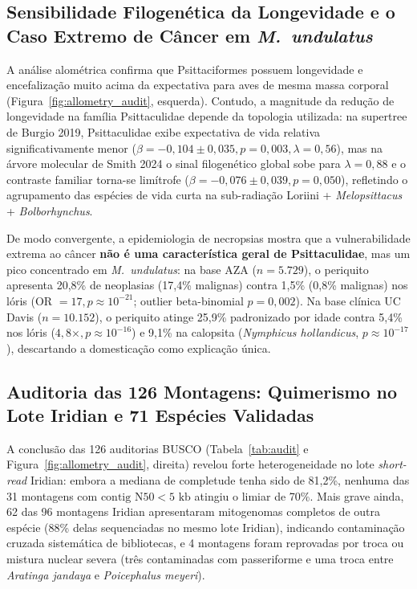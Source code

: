 \documentclass[10pt,a4paper,twocolumn]{article}
\begin{document}
\subsection{Sensibilidade Filogenética da Longevidade e o Caso Extremo de Câncer em \textit{M.\ undulatus}}
A análise alométrica confirma que Psittaciformes possuem longevidade e encefalização muito acima da expectativa para aves de mesma massa corporal (Figura~\ref{fig:allometry_audit}, esquerda). Contudo, a magnitude da redução de longevidade na família Psittaculidae depende da topologia utilizada: na supertree de Burgio 2019, Psittaculidae exibe expectativa de vida relativa significativamente menor ($\beta = -0,104 \pm 0,035, p = 0,003, \lambda = 0,56$), mas na árvore molecular de Smith 2024 o sinal filogenético global sobe para $\lambda = 0,88$ e o contraste familiar torna-se limítrofe ($\beta = -0,076 \pm 0,039, p = 0,050$), refletindo o agrupamento das espécies de vida curta na sub-radiação Loriini + \textit{Melopsittacus} + \textit{Bolborhynchus}.

De modo convergente, a epidemiologia de necropsias mostra que a vulnerabilidade extrema ao câncer \textbf{não é uma característica geral de Psittaculidae}, mas um pico concentrado em \textit{M.\ undulatus}: na base AZA ($n = 5.729$), o periquito apresenta 20,8\% de neoplasias (17,4\% malignas) contra 1,5\% (0,8\% malignas) nos lóris (OR $= 17, p \approx 10^{-21}$; outlier beta-binomial $p = 0,002$). Na base clínica UC Davis ($n = 10.152$), o periquito atinge 25,9\% padronizado por idade contra 5,4\% nos lóris ($4,8\times, p \approx 10^{-16}$) e 9,1\% na calopsita (\textit{Nymphicus hollandicus}, $p \approx 10^{-17}$), descartando a domesticação como explicação única.

\subsection{Auditoria das 126 Montagens: Quimerismo no Lote Iridian e 71 Espécies Validadas}
A conclusão das 126 auditorias BUSCO (Tabela~\ref{tab:audit} e Figura~\ref{fig:allometry_audit}, direita) revelou forte heterogeneidade no lote \textit{short-read} Iridian: embora a mediana de completude tenha sido de 81,2\%, nenhuma das 31 montagens com $\text{contig N50} < 5\text{ kb}$ atingiu o limiar de 70\%. Mais grave ainda, 62 das 96 montagens Iridian apresentaram mitogenomas completos de outra espécie (88\% delas sequenciadas no mesmo lote Iridian), indicando contaminação cruzada sistemática de bibliotecas, e 4 montagens foram reprovadas por troca ou mistura nuclear severa (três contaminadas com passeriforme e uma troca entre \textit{Aratinga jandaya} e \textit{Poicephalus meyeri}).
\end{document}
